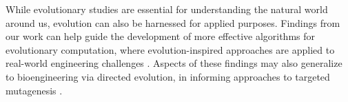 While evolutionary studies are essential for understanding the natural world around us, evolution can also be harnessed for applied purposes.
Findings from our work can help guide the development of more effective algorithms for evolutionary computation, where evolution-inspired approaches are applied to real-world engineering challenges \citep{holland1992genetic}.
Aspects of these findings may also generalize to bioengineering via directed evolution, in informing approaches to targeted mutagenesis \citep{sandberg2019emergence}.

